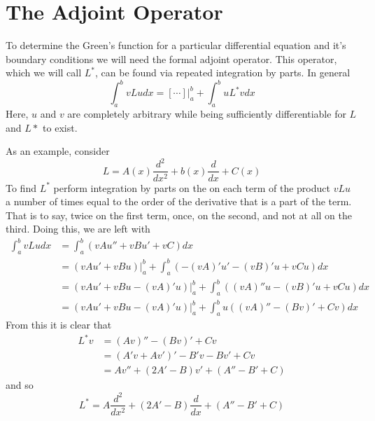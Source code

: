 \section{The Adjoint Operator}
To determine the Green's function for a particular differential equation and it's boundary conditions we will need the formal adjoint operator. This operator, which we will call \(L^*\), can be found via repeated integration by parts. In general
\begin{equation}
	\int_a^b vLu dx = [\cdots]\biggr\rvert_a^b + \int_a^b uL^*v dx
\end{equation}
Here, \(u\) and \(v\) are completely arbitrary while being sufficiently differentiable for \(L\) and \(L*\) to exist. 

As an example, consider
\begin{equation}
	L= A(x) \frac{d^2}{dx^2} + b(x)\frac{d}{dx} + C(x)
\end{equation}
To find \(L^*\) perform integration by parts on the on each term of the product \(vLu\) a number of times equal to the order of the derivative that is a part of the term. That is to say, twice on the first term, once, on the second, and not at all on the third. Doing this, we are left with
\begin{equation}
	\begin{split}
		\int_a^b vLu dx &= \int_a^b (vAu''+ vBu' + vC)dx\\
		&=(vAu'+vBu)\biggr\rvert_a^b + \int_a^b (-(vA)'u'-(vB)'u+vCu)dx\\
		&=(vAu'+vBu-(vA)'u)\biggr\rvert_a^b + \int_a^b ((vA)''u-(vB)'u+vCu)dx\\
		&=(vAu'+vBu-(vA)'u)\biggr\rvert_a^b + \int_a^b u((vA)''-(Bv)'+Cv)dx
	\end{split}
\end{equation}
From this it is clear that 
\begin{equation}
	\begin{split}
		L^*v &= (Av)''-(Bv)'+Cv\\
		     &= (A'v+Av')'-B'v-Bv'+Cv\\
		     &= Av''+(2A'-B)v'+(A''-B'+C)
	\end{split}
\end{equation}
and so
\begin{equation}
	L^*=A\frac{d^2}{dx^2} + (2A'-B)\frac{d}{dx}+(A''-B'+C)
\end{equation}
